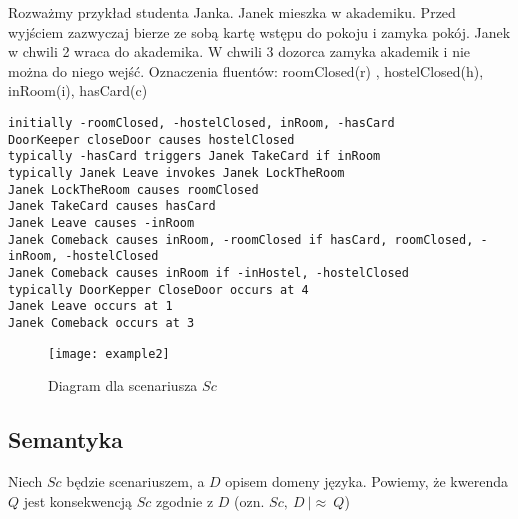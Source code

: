 \begin{example}
Rozważmy przykład studenta Janka. Janek mieszka w akademiku. 
Przed wyjściem zazwyczaj bierze ze sobą kartę wstępu do pokoju i zamyka pokój. 
Janek w chwili 2 wraca do akademika. W chwili 3 dozorca zamyka akademik i nie można do niego wejść. 
Oznaczenia fluentów: roomClosed(r) , hostelClosed(h), inRoom(i), hasCard(c)

	\begin{lstlisting}
initially -roomClosed, -hostelClosed, inRoom, -hasCard
DoorKeeper closeDoor causes hostelClosed
typically -hasCard triggers Janek TakeCard if inRoom
typically Janek Leave invokes Janek LockTheRoom
Janek LockTheRoom causes roomClosed
Janek TakeCard causes hasCard
Janek Leave causes -inRoom
Janek Comeback causes inRoom, -roomClosed if hasCard, roomClosed, -inRoom, -hostelClosed
Janek Comeback causes inRoom if -inHostel, -hostelClosed
typically DoorKepper CloseDoor occurs at 4
Janek Leave occurs at 1
Janek Comeback occurs at 3
	\end{lstlisting}

\begin{figure}[h!]
	\centering
	\texttt{[image: example2]}
	\caption{Diagram dla scenariusza $Sc$}
	\label{PicSC5}
\end{figure}
\end{example}

\subsection{Semantyka}
Niech $Sc$ będzie scenariuszem, a $D$ opisem domeny języka. Powiemy, że kwerenda $Q$ jest konsekwencją
$Sc$ zgodnie z $D$ (ozn. $Sc,\ D\ |\approx\ Q $)

